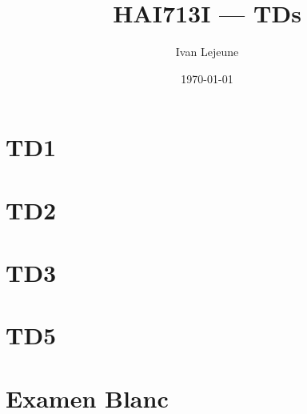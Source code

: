 \documentclass[french,a4paper,10pt]{article}
\title{\color{astral} \sffamily \bfseries HAI713I --- TDs}
\author{Ivan Lejeune}
\date{\today}
\begin{document}
    \maketitle
    \tableofcontents

    \newpage
    \section{TD1}\label{sec:TD1}
    \setcounter{tdcounter}{0}
    

    \newpage
    \section{TD2}\label{sec:TD2}
    \setcounter{tdcounter}{0}
    

    \newpage
    \section{TD3}\label{sec:TD3}
    \setcounter{tdcounter}{0}
    

    \newpage
    \section{TD5}\label{sec:TD5}
    \setcounter{tdcounter}{0}
    

    \newpage
    \section{Examen Blanc}\label{sec:Examen_Blanc}
    \setcounter{tdcounter}{0}
    
\end{document}
